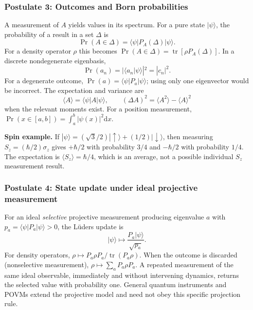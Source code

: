 \documentclass[11pt,a4paper]{article}
\newcommand{\dd}{\mathrm{d}}
\newcommand{\tr}{\operatorname{tr}}
\begin{document}
\subsubsection{Postulate 3: Outcomes and Born probabilities}
A measurement of $A$ yields values in its spectrum. For a pure state $|\psi\rangle$, the probability of a result in a set $\Delta$ is
\begin{equation}
\boxed{\Pr(A\in\Delta)=\langle\psi|P_A(\Delta)|\psi\rangle}.
\end{equation}
For a density operator $\rho$ this becomes $\Pr(A\in\Delta)=\tr[\rho P_A(\Delta)]$. In a discrete nondegenerate eigenbasis,
\begin{equation}
\Pr(a_n)=|\langle a_n|\psi\rangle|^2=|c_n|^2.
\end{equation}
For a degenerate outcome, $\Pr(a)=\langle\psi|P_a|\psi\rangle$; using only one eigenvector would be incorrect. The expectation and variance are
\begin{equation}
\boxed{\langle A\rangle=\langle\psi|A|\psi\rangle},\qquad
\boxed{(\Delta A)^2=\langle A^2\rangle-\langle A\rangle^2}
\end{equation}
when the relevant moments exist. For a position measurement, $\Pr(x\in[a,b])=\int_a^b|\psi(x)|^2\dd x$.
\par\textbf{Spin example.} If $|\psi\rangle=(\sqrt3/2)|\uparrow\rangle+(1/2)|\downarrow\rangle$, then measuring $S_z=(\hbar/2)\sigma_z$ gives $+\hbar/2$ with probability $3/4$ and $-\hbar/2$ with probability $1/4$. The expectation is $\langle S_z\rangle=\hbar/4$, which is an average, not a possible individual $S_z$ measurement result.

\subsubsection{Postulate 4: State update under ideal projective measurement}
For an ideal \emph{selective} projective measurement producing eigenvalue $a$ with $p_a=\langle\psi|P_a|\psi\rangle>0$, the Lüders update is
\begin{equation}
\boxed{|\psi\rangle\longmapsto\frac{P_a|\psi\rangle}{\sqrt{p_a}}}.
\end{equation}
For density operators, $\rho\mapsto P_a\rho P_a/\tr(P_a\rho)$. When the outcome is discarded (nonselective measurement), $\rho\mapsto\sum_aP_a\rho P_a$. A repeated measurement of the same ideal observable, immediately and without intervening dynamics, returns the selected value with probability one. General quantum instruments and POVMs extend the projective model and need not obey this specific projection rule.
\end{document}
